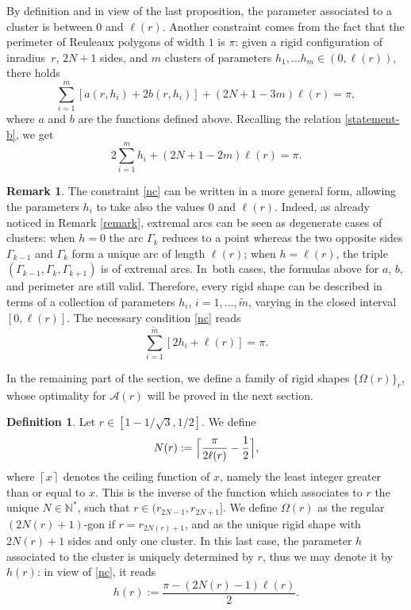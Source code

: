 \documentclass[JEP,XML,SOM,Unicode,NoFloatCountersInSection]{cedram}
\let\mathcal\mathscr
\theoremstyle{plain}
\theoremstyle{definition}
\newtheorem{definition}[theorem]{Definition}
\newtheorem{remark}[theorem]{Remark}
\newcommand\A{\mathcal A}
\let\B\Gamma
\begin{document}
By definition and in view of the last proposition, the parameter associated to a cluster is between $0$ and $\ell(r)$. Another constraint comes from the fact that the perimeter of Reuleaux polygons of width $1$ is $\pi$: given a rigid configuration of inradius~$r$, $2N+1$ sides, and $m$ clusters of parameters $h_1, \ldots h_m \in (0,\ell(r))$, there holds
\[
\sum_{i=1}^m [a(r,h_i) + 2 b(r,h_i)] + (2N+1-3m)\ell(r)=\pi,
\]
where $a$ and $b$ are the functions defined above. Recalling the relation \eqref{statement-b}, we get
\begin{equation}\label{nc}
2 \sum_{i=1}^m h_i + (2N+1-2m)\ell(r)= \pi.
\end{equation}

\begin{remark}\label{rem-cluster}
The constraint \eqref{nc} can be written in a more general form, allowing the parameters $h_i$ to take also the values $0$ and $\ell(r)$. Indeed, as already noticed in Remark \ref{remark}, extremal arcs can be seen as degenerate cases of clusters: when $h=0$ the arc $\B_k$ reduces to a point whereas the two opposite sides $\B_{k-1}$ and $\B_k$ form a unique arc of length $\ell(r)$; when $h=\ell(r)$, the triple $(\B_{k-1},\B_k, \B_{k+1})$ is of extremal arcs. In~both cases, the formulas above for $a$, $b$, and perimeter are still valid. Therefore, every rigid shape can be described in terms of a collection of parameters $h_i$, $i=1,\ldots, \tilde{m}$, varying in the closed interval $[0,\ell(r)]$. The necessary condition \eqref{nc} reads
\begin{equation}\label{nc2}
\sum_{i=1}^{\tilde m} [2 h_i + \ell(r)]= \pi.
\end{equation}
\end{remark}

In the remaining part of the section, we define a family of rigid shapes $\{\Omega(r)\}_r$, whose optimality for $\A(r)$ will be proved in the next section.
\begin{definition}\label{def-optimals} Let $r\in [1-1/\sqrt{3}, 1/2]$. We define
\begin{equation}\label{def-N}
N(r):=\Bigl \lceil{ \frac{\pi}{2\ell(r)}-\frac12 }\Bigr \rceil,
\end{equation}
where $\left \lceil{x}\right \rceil$ denotes the ceiling function of $x$, namely the least integer greater than or equal to $x$. This is the inverse of the function which associates to $r$ the unique $N\in \mathbb N^*$, such that $r\in (r_{2N-1}, r_{2N+1}]$.
We define $\Omega(r)$ as the regular $(2N(r)+1)$-gon if $r=r_{2N(r)+1}$, and as the unique rigid shape with $2N(r)+1$ sides and only one cluster. In this last case, the parameter $h$ associated to the cluster is uniquely determined by $r$, thus we may denote it by $h(r)$: in view of \eqref{nc}, it reads
\begin{equation}\label{uniqueh}
h(r):= \frac{\pi - (2N(r)-1)\ell(r)}{2}.
\end{equation}
\end{definition}
\end{document}
